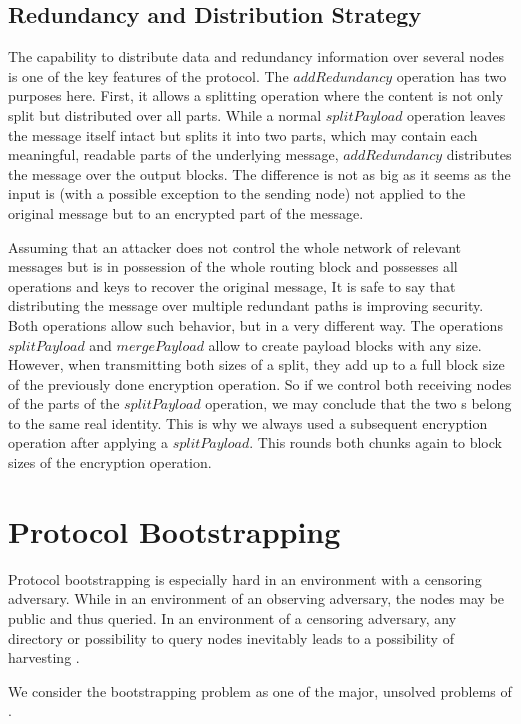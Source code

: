 \section{Redundancy and Distribution Strategy}
The capability to distribute data and redundancy information over several nodes is one of the key features of the protocol. The $addRedundancy$ operation has two purposes here. First, it allows a splitting operation where the content is not only split but distributed over all parts. While a normal $splitPayload$ operation leaves the message itself intact but splits it into two parts, which may contain each meaningful, readable parts of the underlying message, $addRedundancy$ distributes the message over the output blocks. The difference is not as big as it seems as the input is (with a possible exception to the sending node) not applied to the original message but to an encrypted part of the message.

Assuming that an attacker does not control the whole network of relevant messages but is in possession of the whole routing block and possesses all operations and keys to recover the original message, It is safe to say that distributing the message over multiple redundant paths is improving security. Both operations allow such behavior, but in a very different way. The operations $splitPayload$ and $mergePayload$ allow to create payload blocks with any size. However, when transmitting both sizes of a split, they add up to a full block size of the previously done encryption operation. So if we control both receiving nodes of the parts of the $splitPayload$ operation, we may conclude that the two s belong to the same real identity. This is why we always used a subsequent encryption operation after applying a $splitPayload$. This rounds both chunks again to block sizes of the encryption operation.

\chapter{Protocol Bootstrapping\label{sec:keyDistribution}}
Protocol bootstrapping is especially hard in an environment with a censoring adversary. While in an environment of an observing adversary, the nodes may be public and thus queried. In an environment of a censoring adversary, any directory or possibility to query nodes inevitably leads to a possibility of harvesting \VortexNodes{}. 

We consider the bootstrapping problem as one of the major, unsolved problems of \MessageVortex.

